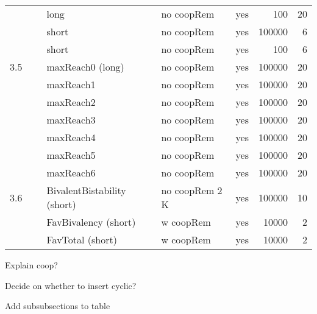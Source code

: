 \begin{table}[htbp!]
\begin{tabular}{lllllrr}
        ~                       & ~ & long                          & no coopRem     & yes     & 100                       & 20                                   \\
        ~                       & ~ & short                         & no coopRem     & yes     & 100000                    & 6                                    \\
        ~                       & ~ & short                         & no coopRem     & yes     & 100                       & 6                                    \\
        \multicolumn{1}{r}{3.5} & ~ & maxReach0 (long)              & no coopRem     & yes     & 100000                    & 20                                   \\
        ~                       & ~ & maxReach1                     & no coopRem     & yes     & 100000                    & 20                                   \\
        ~                       & ~ & maxReach2                     & no coopRem     & yes     & 100000                    & 20                                   \\
        ~                       & ~ & maxReach3                     & no coopRem     & yes     & 100000                    & 20                                   \\
        ~                       & ~ & maxReach4                     & no coopRem     & yes     & 100000                    & 20                                   \\
        ~                       & ~ & maxReach5                     & no coopRem     & yes     & 100000                    & 20                                   \\
        ~                       & ~ & maxReach6                     & no coopRem     & yes     & 100000                    & 20                                   \\
        \multicolumn{1}{r}{3.6} & ~ & BivalentBistability
          (short) & no coopRem 2 K & yes     & 100000                    & 10                                   \\
        ~                       & ~ & FavBivalency (short)          & w coopRem      & yes     & 10000                     & 2                                    \\
        ~                       & ~ & FavTotal (short)              & w coopRem      & yes     & 10000                     & 2
    \end{tabular}
    \label{tab:simulationParametersSummary}
\end{table}
\begin{itemize}
    {
        \color{red}
        \item Explain coop?
        \item Decide on whether to insert cyclic?
        \item Add subsubsections to table
    }
\end{itemize}



